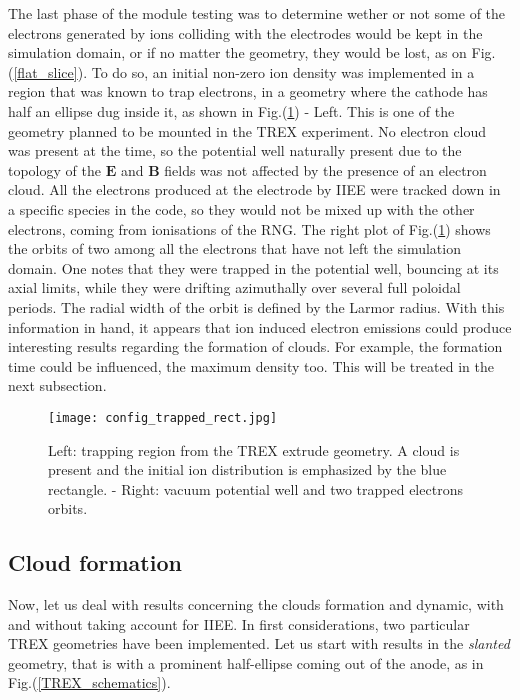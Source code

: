 The last phase of the module testing was to determine wether or not some of the electrons generated by ions colliding with the electrodes would be kept in the simulation domain, or if no matter the geometry, they would be lost, as on Fig.(\ref{flat_slice}). To do so, an initial non-zero ion density was implemented in a region that was known to trap electrons, in a geometry where the cathode has half an ellipse dug inside it, as shown in Fig.(\ref{config_trapped}) - Left. This is one of the geometry planned to be mounted in the TREX experiment. No electron cloud was present at the time, so the potential well naturally present due to the topology of the $\mathbf{E}$ and $\mathbf{B}$ fields was not affected by the presence of an electron cloud. All the electrons produced at the electrode by IIEE were tracked down in a specific species in the code, so they would not be mixed up with the other electrons, coming from ionisations of the RNG. The right plot of Fig.(\ref{config_trapped}) shows the orbits of two among all the electrons that have not left the simulation domain. One notes that they were trapped in the potential well, bouncing at its axial limits, while they were drifting azimuthally over several full poloidal periods. The radial width of the orbit is defined by the Larmor radius. With this information in hand, it appears that ion induced electron emissions could produce interesting results regarding the formation of clouds. For example, the formation time could be influenced, the maximum density too. This will be treated in the next subsection.\\

\begin{figure}[h!]
\centering
	\texttt{[image: config\_trapped\_rect.jpg]}
	\caption{\label{config_trapped} Left: trapping region from the TREX extrude geometry. A cloud is present and the initial ion distribution is emphasized by the blue rectangle. - Right: vacuum potential well and two trapped electrons orbits.}
\end{figure}  

\subsection{Cloud formation}

Now, let us deal with results concerning the clouds formation and dynamic, with and without taking account for IIEE. In first considerations, two particular TREX geometries have been implemented. Let us start with results in the \emph{slanted} geometry, that is with a prominent half-ellipse coming out of the anode, as in Fig.({\ref{TREX_schematics}}).\\

